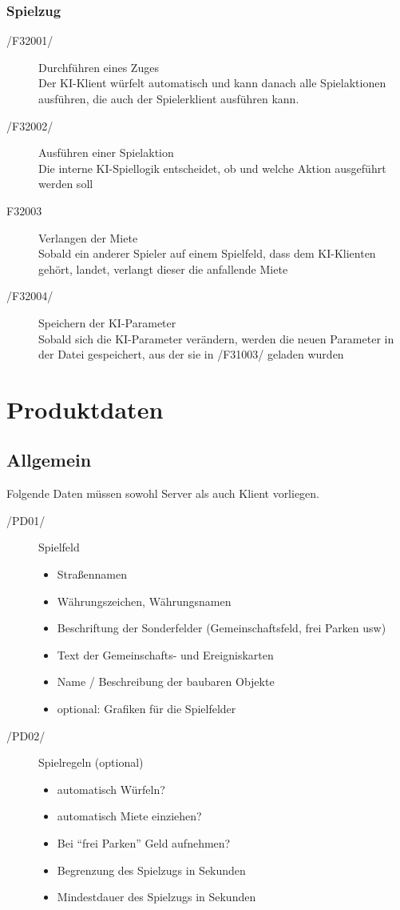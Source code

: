 \documentclass[a4paper,10pt]{article}
\begin{document}
\subsubsection{Spielzug}
\begin{description}
\item[/F32001/] Durchführen eines Zuges\\
Der KI-Klient würfelt automatisch und kann danach alle Spielaktionen ausführen, die auch der Spielerklient ausführen kann.
\item[/F32002/] Ausführen einer Spielaktion \\
Die interne KI-Spiellogik entscheidet, ob und welche Aktion ausgeführt werden soll
\item[F32003] Verlangen der Miete \\
Sobald ein anderer Spieler auf einem Spielfeld, dass dem KI-Klienten gehört, landet, verlangt dieser die anfallende Miete
\item[/F32004/]Speichern der KI-Parameter \\
Sobald sich die KI-Parameter verändern, werden die neuen Parameter in der Datei gespeichert, aus der sie in /F31003/ geladen wurden
\end{description}

\section{Produktdaten}
\subsection{Allgemein}
Folgende Daten müssen sowohl Server als auch Klient vorliegen.
\begin{description}
\item[/PD01/] Spielfeld
\begin{itemize}
\item Straßennamen
\item Währungszeichen, Währungsnamen
\item Beschriftung der Sonderfelder (Gemeinschaftsfeld, frei Parken usw)
\item Text der Gemeinschafts- und Ereigniskarten
\item Name / Beschreibung der baubaren Objekte
\item optional: Grafiken für die Spielfelder
\end{itemize}
\item[/PD02/] Spielregeln (optional)
\begin{itemize}
\item automatisch Würfeln?
\item automatisch Miete einziehen?
\item Bei "`frei Parken"' Geld aufnehmen?
\item Begrenzung des Spielzugs in Sekunden
\item Mindestdauer des Spielzugs in Sekunden
\end{itemize}
\end{description}
\end{document}
